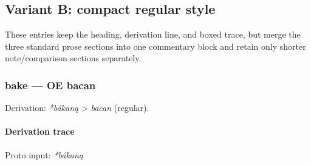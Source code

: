 \documentclass[
  british,
  a4paper,
]{article}
\begin{document}
\clearpage

\subsection{Variant B: compact regular
style}\label{variant-b-compact-regular-style}

These entries keep the heading, derivation line, and boxed trace, but
merge the three standard prose sections into one commentary block and
retain only shorter note/comparison sections separately.

\subsubsection{bake --- OE bacan}\label{bake-oe-bacan-1}

Derivation: \emph{*bákaną} \textgreater{} \emph{bacan} (regular).

\paragraph{Derivation trace}\label{derivation-trace-12}

Proto input: \emph{*bákaną}

\begingroup
\setlength{\fboxsep}{6pt}
\end{document}

